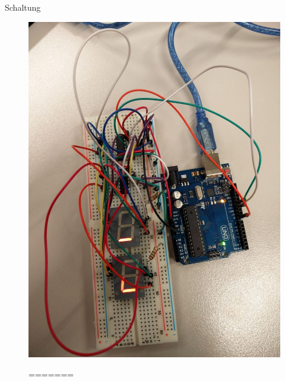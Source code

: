 \documentclass[mathserif,9pt]{article}
\begin{document}
\begin{frame}{Schaltung}
\begin{block}{}
\begin{minipage}[c]{0.3\textwidth}
\begin{figure}
                    \includegraphics[width=\textwidth]{img/breadboard.jpg}
                    \caption[M2]{(M2) erster Test d. Segmentanzeigen}
=======
               \begin{figure} 

\end{figure}
\end{figure}
\end{minipage}
\end{block}
\end{frame}
\end{document}
